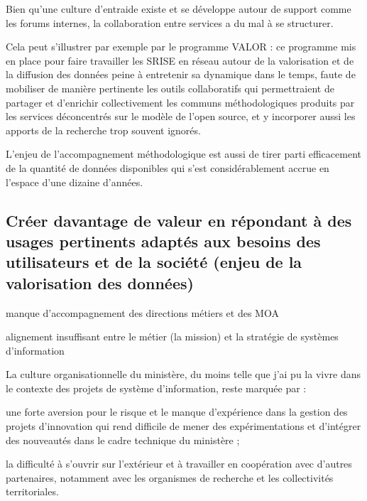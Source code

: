 Bien qu'une culture d'entraide existe et se développe autour de support comme
les forums internes, la collaboration entre services a du mal à se structurer.

Cela peut s'illustrer par exemple par le programme VALOR : ce programme mis en
place pour faire travailler les SRISE en réseau autour de la valorisation et
de la diffusion des données peine à entretenir sa dynamique dans le temps,
faute de mobiliser de manière pertinente les outils collaboratifs qui
permettraient de partager et d'enrichir collectivement les communs
méthodologiques produits par les services déconcentrés sur le modèle de l'open
source, et y incorporer aussi les apports de la recherche trop souvent
ignorés.

L'enjeu de l'accompagnement méthodologique est aussi de tirer parti
efficacement de la quantité de données disponibles qui s’est considérablement
accrue en l'espace d'une dizaine d'années.

\subsection[constats:creation_valeur]
{Créer davantage de valeur en répondant à des usages pertinents adaptés aux
besoins des utilisateurs et de la société (enjeu de la valorisation des
données)}

\subject{Constats}

{\it

\startitemize[a,packed]

\item manque d'accompagnement des directions métiers et des MOA

\item alignement insuffisant entre le métier (la mission) et la stratégie de
systèmes d'information

\stopitemize}

La culture organisationnelle du ministère, du moins telle que j'ai pu la vivre
dans le contexte des projets de système d'information, reste marquée par :

\startitemize

\item une forte aversion pour le risque et le manque d'expérience dans la gestion
des projets d'innovation qui rend difficile de mener des expérimentations et
d'intégrer des nouveautés dans le cadre technique du ministère ;

\item la difficulté à s'ouvrir sur l'extérieur et à travailler en coopération avec
d'autres partenaires, notamment avec les organismes de recherche et les
collectivités territoriales.

